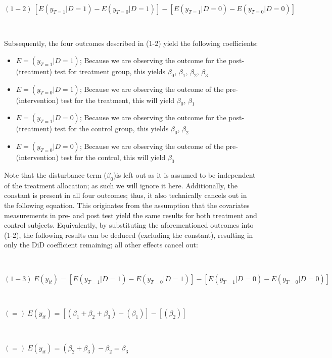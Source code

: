 \documentclass[a4paper]{article}
\begin{document}
\

$
(1-2) \ [E(y_{T=1} | D=1) - E(y_{T=0} | D=1)] - [E(y_{T=1} | D=0) - E(y_{T=0} | D=0)]
$

\

Subsequently, the four outcomes described in (1-2) yield the following coefficients:

\begin{itemize}
\item $E = (y_{T=1} | D=1)$; Because we are observing the outcome for the post-(treatment) test for treatment group, this yields $\beta_{0}$, $\beta_{1}$, $\beta_{2}$, $\beta_{3}$
\item $E = (y_{T=0} | D=1)$; Because we are observing the outcome of the pre-(intervention) test for the treatment, this will yield $\beta_{0}$, $\beta_{1}$
\item $E = (y_{T=1} | D=0)$; Because we are observing the outcome for the post-(treatment) test for the control group, this yields $\beta_{0}$, $\beta_{2}$ 
\item $E = (y_{T=0} | D=0)$; Because we are observing the outcome of the pre-(intervention) test for the control, this will yield $\beta_{0}$
\end{itemize}

Note that the disturbance term ($\beta_{0}$)is left out as it is assumed to be independent of the treatment allocation; as such we will ignore it here. 
Additionally, the constant is present in all four outcomes; thus, it also technically cancels out in the following equation. This originates from the assumption that the covariates measurements in pre- and post test yield the same results for both treatment and control subjects. Equivalently, by substituting the aforementioned outcomes into (1-2), the following results can be deduced (excluding the constant), resulting in only the DiD coefficient remaining; all other effects cancel out:

\

$
(1-3) \ E(y_{it}) =  [E(y_{T=1} | D=1) - E(y_{T=0} | D=1)] - [E(y_{T=1} | D=0) - E(y_{T=0} | D=0)]
$

\

$
 (=) \ E(y_{it}) = [(\beta_{1} + \beta_{2} + \beta_{3}) - (\beta_{1})] - [(\beta_{2})]
$

\

$
(=) \ E(y_{it}) = (\beta_{2} + \beta_{3}) - \beta_{2} = \beta_{3}
$
\end{document}
